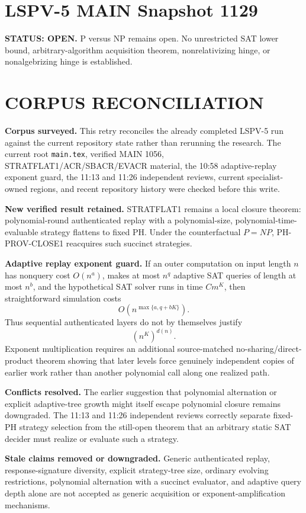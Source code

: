 \documentclass[11pt]{article}
\begin{document}
\section*{LSPV-5 MAIN Snapshot 1129}

\textbf{STATUS: OPEN.} P versus NP remains open. No unrestricted SAT lower bound, arbitrary-algorithm acquisition theorem, nonrelativizing hinge, or nonalgebrizing hinge is established.

\section*{CORPUS RECONCILIATION}
\textbf{Corpus surveyed.}
This retry reconciles the already completed LSPV-5 run against the current repository state rather than rerunning the research. The current root \texttt{main.tex}, verified MAIN 1056, STRATFLAT1/ACR/SBACR/EVACR material, the 10:58 adaptive-replay exponent guard, the 11:13 and 11:26 independent reviews, current specialist-owned regions, and recent repository history were checked before this write.

\textbf{New verified result retained.}
STRATFLAT1 remains a local closure theorem: polynomial-round authenticated replay with a polynomial-size, polynomial-time-evaluable strategy flattens to fixed PH. Under the counterfactual \(P=NP\), PH-PROV-CLOSE1 reacquires such succinct strategies.

\textbf{Adaptive replay exponent guard.}
If an outer computation on input length \(n\) has nonquery cost \(O(n^a)\), makes at most \(n^q\) adaptive SAT queries of length at most \(n^b\), and the hypothetical SAT solver runs in time \(Cm^K\), then straightforward simulation costs
\[
O\!\left(n^{\max\{a,q+bK\}}\right).
\]
Thus sequential authenticated layers do not by themselves justify
\[
(n^K)^{d(n)}.
\]
Exponent multiplication requires an additional source-matched no-sharing/direct-product theorem showing that later levels force genuinely independent copies of earlier work rather than another polynomial call along one realized path.

\textbf{Conflicts resolved.}
The earlier suggestion that polynomial alternation or explicit adaptive-tree growth might itself escape polynomial closure remains downgraded. The 11:13 and 11:26 independent reviews correctly separate fixed-PH strategy selection from the still-open theorem that an arbitrary static SAT decider must realize or evaluate such a strategy.

\textbf{Stale claims removed or downgraded.}
Generic authenticated replay, response-signature diversity, explicit strategy-tree size, ordinary evolving restrictions, polynomial alternation with a succinct evaluator, and adaptive query depth alone are not accepted as generic acquisition or exponent-amplification mechanisms.
\end{document}
